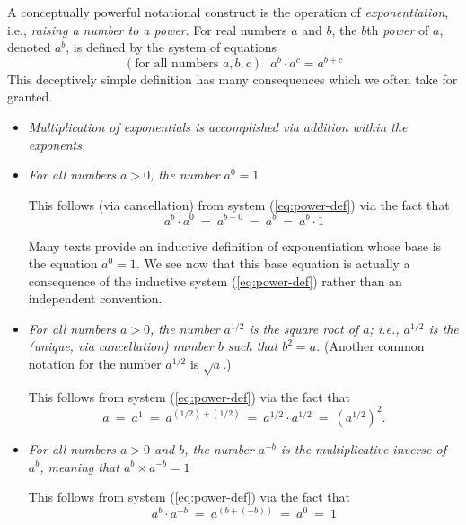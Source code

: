 \noindent
A conceptually powerful notational construct is the operation of {\it exponentiation},  i.e., {\it raising a number to a power}.  For real numbers $a$ and $b$, the  $b$th {\it power} of $a$, denoted $a^b$, is defined by the system of equations
\begin{equation}
\label{eq:power-def}
(\mbox{for all numbers } a, b, c) \ \ \ a^b \cdot a^c = a^{b+c}
\end{equation}
This deceptively simple definition has many consequences which we often take for granted.
 
\begin{itemize}
\item
{\em Multiplication of exponentials is accomplished via addition within the exponents.}

\medskip\item
{\em For all numbers $a>0$, the number $a^0 = 1$}

\smallskip

This follows (via cancellation) from system (\ref{eq:power-def}) via the fact that
\[ a^b \cdot a^0 \ = \ a^{b+0} \ = \ a^b \ = \ a^b \cdot 1  \]

\smallskip

Many texts provide an inductive definition of exponentiation whose base is the equation $a^0 = 1$.  We see now that this base equation is actually a consequence of the inductive system (\ref{eq:power-def}) rather than an independent convention.

\medskip\item
{\em For all numbers $a >0$, the number $a^{1/2}$ is the {\it square root} of $a$; i.e., $a^{1/2}$ is the (unique, via cancellation) number $b$ such that $b^2 = a$.}
(Another common notation for the number $a^{1/2}$ is $\sqrt{a}$.)

\smallskip

This follows from system (\ref{eq:power-def}) via the fact that
\[ a \ = \ a^1 \ = \ a^{(1/2) + (1/2)} \ = \ a^{1/2} \cdot a^{1/2} \ = \ \left(a^{1/2}\right)^2. \]

\medskip\item
{\em For all numbers $a>0$ and $b$, the number $a^{-b}$ is the {\it multiplicative inverse} of $a^b$, meaning that $a^b \times a^{-b} = 1$}

\smallskip

This follows from system (\ref{eq:power-def}) via the fact that
\[ a^b \cdot a^{-b} \ = \ a^{(b + (-b))} \ = \ a^0 \ = \  1 \]
\end{itemize}
